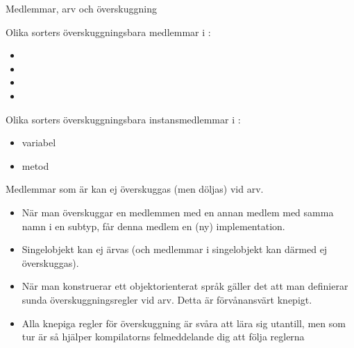 



\begin{Slide}{Medlemmar, arv och överskuggning}\SlideFontTiny
\begin{multicols}{2}
\noindent Olika sorters överskuggningsbara medlemmar i :
\begin{itemize}
\item {}
\item {}
\item {}
\item {}
\end{itemize}

\columnbreak

\pause

\noindent Olika sorters överskuggningsbara instansmedlemmar i :
\begin{itemize}
\item variabel
\item metod
\end{itemize}

{\SlideFontTiny\noindent Medlemmar som är  kan ej överskuggas (men döljas) vid arv.}

\vspace{0.5em}
\end{multicols}

\pause
\begin{itemize}\SlideFontTiny
\item När man överskuggar  en medlemmen med en annan medlem med samma namn i en subtyp, får denna medlem en (ny) implementation.

\item Singelobjekt kan ej ärvas (och medlemmar i singelobjekt kan därmed ej överskuggas).

\item När man konstruerar ett objektorienterat språk gäller det att man definierar sunda överskuggningsregler vid arv. Detta är förvånansvärt knepigt.

\item Alla knepiga regler för överskuggning är svåra att lära sig utantill, men som tur är så hjälper kompilatorns felmeddelande dig att följa reglerna \code{:)}
\end{itemize}
\end{Slide}


